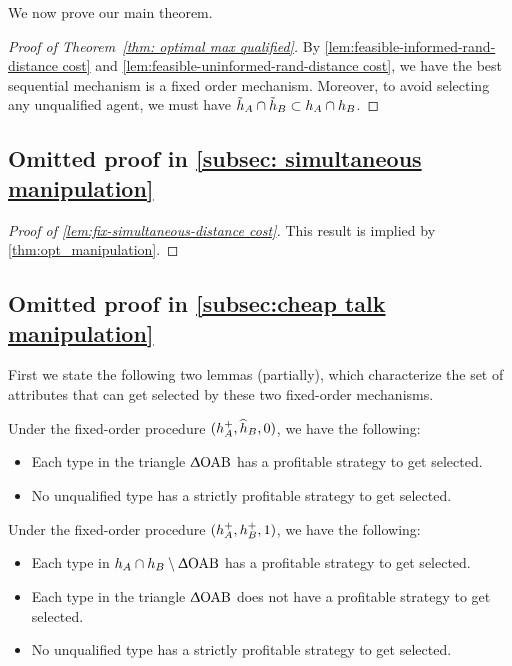 We now prove our main theorem. 

\begin{proof}[Proof of Theorem~\ref{thm: optimal max qualified}]
    By \cref{lem:feasible-informed-rand-distance cost} and \cref{lem:feasible-uninformed-rand-distance cost},  we have the best sequential mechanism is a fixed order mechanism. Moreover, to avoid selecting any unqualified agent, we must have $\tilde {h}_A \cap \tilde {h}_B \subset h_A \cap h_B$.
\end{proof}

\subsection{Omitted proof in \cref{subsec: simultaneous manipulation}}
\begin{proof}[Proof of \cref{lem:fix-simultaneous-distance cost}]
      This result is implied by \cref{thm:opt_manipulation}.
\end{proof}

\subsection{Omitted proof in \cref{subsec:cheap talk manipulation}}\label{appendix:cheap talk manipulation}

First we state the following two lemmas (partially), which characterize the set of attributes that can get selected by these two fixed-order mechanisms.


\begin{lemma}\label{lem:gain non-parallel tests}
 Under the fixed-order procedure $(h_A^+,\widehat{h}_B,0)$, we have the following:
 \begin{itemize}
     \item Each type in the triangle $\Updelta\text{OAB}$ has a profitable strategy to get selected.
     \item No unqualified type has a strictly profitable strategy to get selected.
 \end{itemize}
\end{lemma}

\begin{lemma}\label{lem:loss non-parallel tests}
 Under the fixed-order procedure $(h_A^+,h_B^+,1)$, we have the following:
 \begin{itemize}
     \item Each type in $h_A\cap h_B\setminus \Updelta\text{OAB}$ has a profitable strategy to get selected.
     \item Each type in the triangle $\Updelta\text{OAB}$ does not have a profitable strategy to get selected.
     \item No unqualified type has a strictly profitable strategy to get selected.
 \end{itemize}
\end{lemma}

